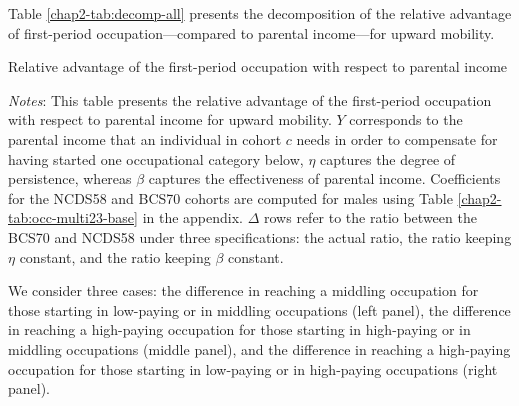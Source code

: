 Table \ref{chap2-tab:decomp-all} presents the decomposition of the relative advantage of first-period occupation---compared to parental income---for upward mobility.
\begin{table}[!tb]
    \centering
    \caption{Relative advantage of the first-period occupation with respect to parental income}
    \label{chap2-tab:decomp-all}
    \begin{threeparttable}
        \setlength{\tabcolsep}{9pt}
        
        \begin{tablenotes}[flushleft]
            \footnotesize{\item\textit{Notes}: This table presents the relative advantage of the first-period occupation with respect to parental income for upward mobility. 
            $Y$ corresponds to the parental income that an individual in cohort $c$ needs in order to compensate for having started one occupational category below, $\eta$ captures the degree of persistence, whereas $\beta$ captures the effectiveness of parental income. 
            Coefficients for the NCDS58 and BCS70 cohorts are computed for males using Table \ref{chap2-tab:occ-multi23-base} in the appendix.
            $\Delta$ rows refer to the ratio between the BCS70 and NCDS58 under three specifications: the actual ratio, the ratio keeping $\eta$ constant, and the ratio keeping $\beta$ constant.}
        \end{tablenotes}
    \end{threeparttable}
\end{table}
We consider three cases: the difference in reaching a middling occupation for those starting in low-paying or in middling occupations (left panel), the difference in reaching a high-paying occupation for those starting in high-paying or in middling occupations (middle panel), and the difference in reaching a high-paying occupation for those starting in low-paying or in high-paying occupations (right panel). 


